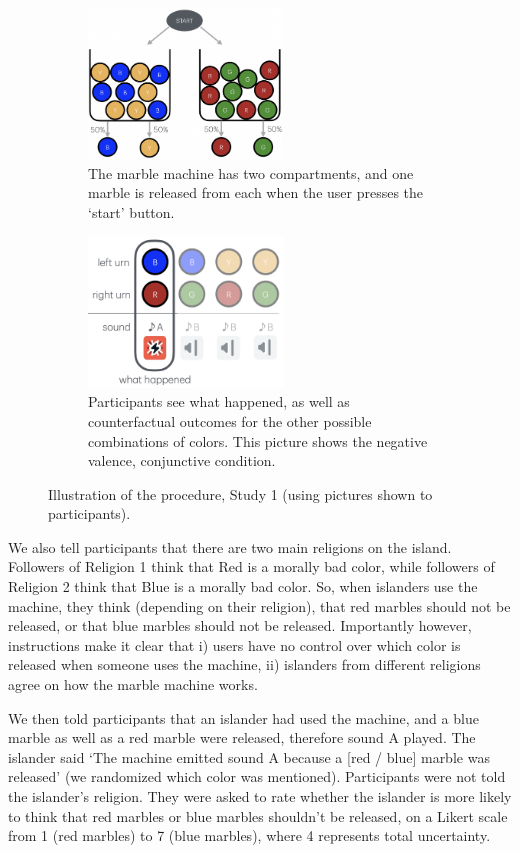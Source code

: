 \documentclass[fleqn,reqno,10pt]{article}
\begin{document}
\begin{figure}
\begin{subfigure}{.5\textwidth}
\centering
\includegraphics[height=4cm]{01-experiments/01-exp-descrNormInference/public/images/marble-machine.png}
\caption{The marble machine has two compartments, and one marble is released from each when the user presses the `start' button.}
\label{fig:sub1}
\end{subfigure}%
\begin{subfigure}{.5\textwidth}
\centering
\includegraphics[height=4cm]{01-experiments/01-exp-descrNormInference/public/images/final-outcome-conjunctive-unpleasant.png}
\caption{Participants see what happened, as well as counterfactual outcomes for the other possible combinations of colors. This picture shows the negative valence, conjunctive condition.}
\label{fig:sub2}
\end{subfigure}
\caption{Illustration of the procedure, Study 1 (using pictures shown to participants).}
\label{fig:methods}
\end{figure}

We also tell participants that there are two main religions on the island. Followers of Religion 1 think that Red is a morally bad color, while followers of Religion 2 think that Blue is a morally bad color. So, when islanders use the machine, they think (depending on their religion), that red marbles should not be released, or that blue marbles should not be released. Importantly however, instructions make it clear that i) users have no control over which color is released when someone uses the machine, ii) islanders from different religions agree on how the marble machine works.

We then told participants that an islander had used the machine, and a blue marble as well as a red marble were released, therefore sound A played. The islander said `The machine emitted sound A because a [red / blue] marble was released' (we randomized which color was mentioned). Participants were not told the islander's religion. They were asked to rate whether the islander is more likely to think that red marbles or blue marbles shouldn't be released, on a Likert scale from 1 (red marbles) to 7 (blue marbles), where 4 represents total uncertainty.
\end{document}
